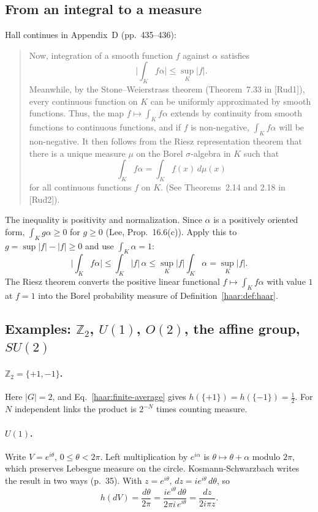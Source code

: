 \subsection{From an integral to a measure}\label{haar:sec:riesz}
Hall continues in Appendix~D (pp.~435--436):
\begin{quote}
Now, integration of a smooth function $f$ against $\alpha$ satisfies
\[
 \Big|\int_Kf\alpha\Big|\le\sup_K|f|.
\]
Meanwhile, by the Stone--Weierstrass theorem (Theorem~7.33 in [Rud1]), every
continuous function on $K$ can be uniformly approximated by smooth
functions. Thus, the map $f\mapsto\int_Kf\alpha$ extends by continuity from
smooth functions to continuous functions, and if $f$ is non-negative,
$\int_Kf\alpha$ will be non-negative. It then follows from the Riesz
representation theorem that there is a unique measure $\mu$ on the Borel
$\sigma$-algebra in $K$ such that
\[
 \int_Kf\alpha=\int_Kf(x)\,d\mu(x)
\]
for all continuous functions $f$ on $K$. (See Theorems~2.14 and 2.18 in
[Rud2]).
\end{quote}
The inequality is positivity and normalization. Since $\alpha$ is a
positively oriented form, $\int_Kg\alpha\ge0$ for $g\ge0$ (Lee,
Prop.~16.6(c)). Apply this to $g=\sup|f|-|f|\ge0$ and use $\int_K\alpha=1$:
\begin{equation}
 \Big|\int_Kf\alpha\Big|\le\int_K|f|\,\alpha\le\sup_K|f|\int_K\alpha=\sup_K|f| .
\end{equation}
The Riesz theorem converts the positive linear functional
$f\mapsto\int_Kf\alpha$ with value $1$ at $f=1$ into the Borel probability
measure of Definition~\ref{haar:def:haar}.

\subsection{Examples: \texorpdfstring{$\mathbb Z_2$}{Z2}, \texorpdfstring{$U(1)$}{U(1)}, \texorpdfstring{$O(2)$}{O(2)}, the affine group, \texorpdfstring{$SU(2)$}{SU(2)}}
\paragraph{$\mathbb Z_2=\{+1,-1\}$.} Here $|G|=2$, and
Eq.~\eqref{haar:finite-average} gives $h(\{+1\})=h(\{-1\})=\tfrac12$. For
$N$ independent links the product is $2^{-N}$ times counting measure.

\paragraph{$U(1)$.} Write $V=e^{i\theta}$, $0\le\theta<2\pi$. Left
multiplication by $e^{i\alpha}$ is $\theta\mapsto\theta+\alpha$ modulo
$2\pi$, which preserves Lebesgue measure on the circle. Kosmann-Schwarzbach
writes the result in two ways (p.~35). With $z=e^{i\theta}$,
$dz=ie^{i\theta}\,d\theta$, so
\begin{equation}\label{haar:U1}
 h(dV)=\frac{d\theta}{2\pi}=\frac{ie^{i\theta}\,d\theta}{2\pi i\,e^{i\theta}}
 =\frac{dz}{2i\pi z}.
\end{equation}

